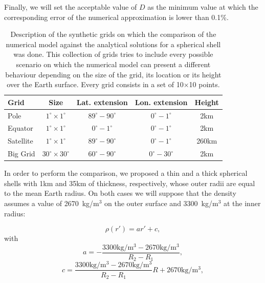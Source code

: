 \documentclass[extra]{gji}
\begin{document}
Finally, we will set the acceptable value of $D$ as the minimum value
at which the corresponding error of the numerical approximation is
lower than 0.1\%.

\begin{table}
\caption{
    Description of the synthetic grids on which the comparison of the
    numerical model against the analytical solutions for a spherical
    shell was done.
    This collection of grids tries to include every possible scenario
    on which the numerical model can present a different behaviour
    depending on the size of the grid, its location or its height over
    the Earth surface. Every grid consists in a set of 10$\times$10
    points.
}
\label{tab:grids}
\begin{tabular}{lcccc}
    Grid & Size & Lat. extension & Lon. extension & Height \\ \hline
    Pole & $1^\circ \times 1^\circ$ & $89^\circ - 90^\circ$ &
        $0^\circ - 1^\circ$ & 2km \\
    Equator & $1^\circ \times 1^\circ$ & $0^\circ - 1^\circ$ &
        $0^\circ - 1^\circ$ & 2km \\
    Satellite & $1^\circ \times 1^\circ$ & $89^\circ - 90^\circ$ &
        $0^\circ - 1^\circ$ & 260km \\
    Big Grid & $30^\circ \times 30^\circ$ & $60^\circ - 90^\circ$ &
        $0^\circ - 30^\circ$ & 2km \\
\end{tabular}
\end{table}

In order to perform the comparison, we proposed a thin and a thick
spherical shells with 1km and 35km of thickness, respectively, whose
outer radii are equal to the mean Earth radius.
On both cases we will suppose that the density assumes a value of
2670~kg/m$^3$ on the outer surface and 3300~kg/m$^3$ at the inner
radius:

\begin{equation}
    \rho(r') = ar' + c,
    \label{eq:density-linear}
\end{equation}
\noindent with
\begin{equation}
    a = -\frac{3300\text{kg/m$^3$} - 2670\text{kg/m$^3$}}{R_2 - R_1},
\end{equation}
\begin{equation}
    c = \frac{3300\text{kg/m$^3$} -
        2670\text{kg/m$^3$}}{R_2 - R_1} R +
        2670\text{kg/m$^3$},
\end{equation}
\end{document}
